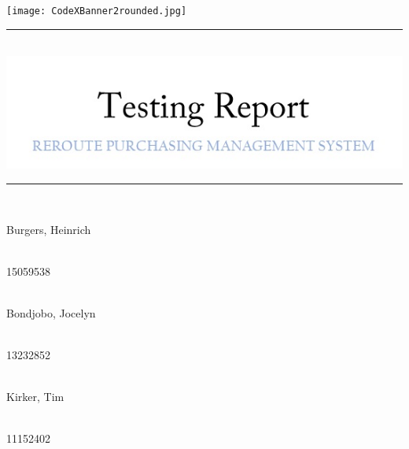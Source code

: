 \begin{titlepage}
	\begin{center}
		\texttt{[image: CodeXBanner2rounded.jpg]}\\[1cm]
		 
		\rule{\linewidth}{0.5mm} \\[1cm]
		{ \includegraphics[width=0.7\linewidth]{TestingReport.jpg}\\[1cm] }
		\rule{\linewidth}{0.5mm} \\[1cm] 			
		  
		  
		\begin{minipage}{0.4\textwidth}
			\begin{flushleft} \large
				 Burgers, Heinrich
			\end{flushleft}
		\end{minipage}
		\begin{minipage}{0.4\textwidth}
			\begin{flushright} \large
				\emph{} \\
				15059538
			\end{flushright}
		\end{minipage}
		
		
		\begin{minipage}{0.4\textwidth}
			\begin{flushleft} \large
				\emph{} \\
				Bondjobo, Jocelyn  
			\end{flushleft}
		\end{minipage}
		\begin{minipage}{0.4\textwidth}
			\begin{flushright} \large
				\emph{} \\
				13232852
			\end{flushright}
		\end{minipage}
		
	
		\begin{minipage}{0.4\textwidth}
			\begin{flushleft} \large
				\emph{} \\	
				Kirker, Tim	
			\end{flushleft}
		\end{minipage}
		\begin{minipage}{0.4\textwidth}
			\begin{flushright} \large
				\emph{} \\
				11152402	
			\end{flushright}
		\end{minipage}
		

\end{center}
\end{titlepage}
